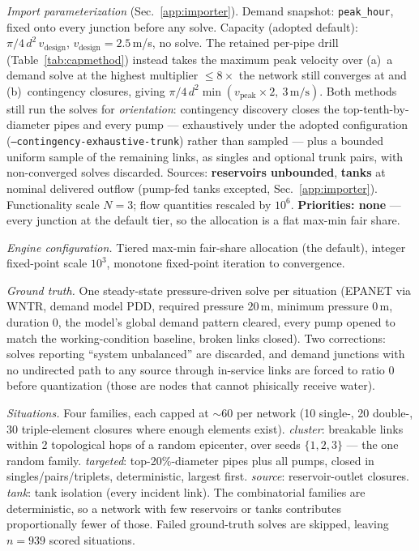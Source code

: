 \documentclass[11pt]{article}
\begin{document}
\emph{Import parameterization} (Sec.~\ref{app:importer}). Demand snapshot:
\texttt{peak\_hour}, fixed onto every junction before any solve. Capacity
(adopted default): $\pi/4\,d^2\,v_{\text{design}}$, $v_{\text{design}}=2.5$\,m/s,
no solve. The retained per-pipe drill (Table~\ref{tab:capmethod}) instead takes
the maximum peak velocity over (a)~a demand solve at the highest multiplier
$\le 8\times$ the network still converges at and (b)~contingency closures, giving
$\pi/4\,d^2 \min(v_{\mathrm{peak}}\!\times\!2,\ 3\,\text{m/s})$. Both methods
still run the solves for \emph{orientation}: contingency discovery closes the
top-tenth-by-diameter pipes and every pump --- exhaustively under the adopted
configuration (\texttt{--contingency-exhaustive-trunk}) rather than sampled ---
plus a bounded uniform sample of the remaining links, as singles and optional
trunk pairs, with non-converged solves discarded. Sources: \textbf{reservoirs
unbounded}, \textbf{tanks} at nominal delivered outflow (pump-fed tanks excepted,
Sec.~\ref{app:importer}). Functionality scale $N=3$; flow quantities rescaled by
$10^6$. \textbf{Priorities: none} --- every junction at the default tier, so the
allocation is a flat max-min fair share.

\emph{Engine configuration.} Tiered max-min fair-share allocation (the default),
integer fixed-point scale $10^3$, monotone fixed-point iteration to convergence.

\emph{Ground truth.} One steady-state pressure-driven solve per situation
(EPANET via WNTR, demand model PDD, required pressure $20\,$m, minimum pressure
$0\,$m, duration 0, the model's global demand pattern cleared, every pump opened
to match the working-condition baseline, broken links closed). Two corrections:
solves reporting ``system unbalanced'' are discarded, and demand junctions with
no undirected path to any source through in-service links are forced to ratio $0$
before quantization (those are nodes that cannot phisically receive water).

\emph{Situations.} Four families, each capped at $\sim\!60$ per network (10
single-, 20 double-, 30 triple-element closures where enough elements exist).
\emph{cluster}: breakable links within 2 topological hops of a random epicenter,
over seeds $\{1,2,3\}$ --- the one random family. \emph{targeted}: top-20\%-diameter
pipes plus all pumps, closed in singles/pairs/triplets, deterministic, largest
first. \emph{source}: reservoir-outlet closures. \emph{tank}: tank isolation
(every incident link). The combinatorial families are deterministic, so a network
with few reservoirs or tanks contributes proportionally fewer of those. Failed
ground-truth solves are skipped, leaving $n = 939$ scored situations.
\end{document}
